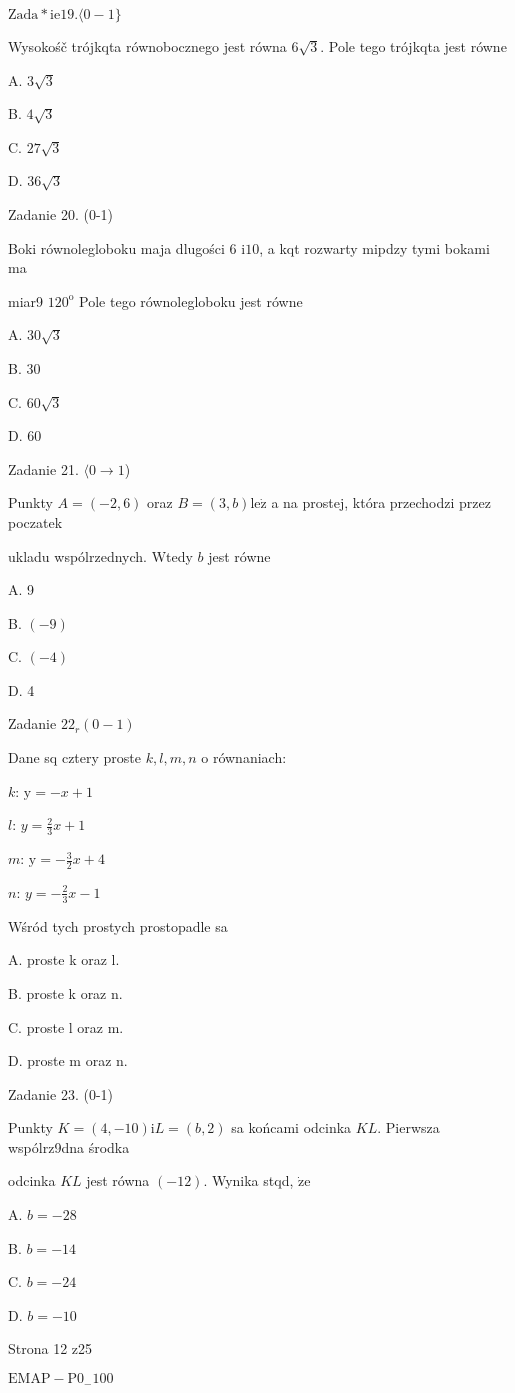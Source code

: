 \documentclass[a4paper,12pt]{article}
\begin{document}
$\mathrm{Z}\mathrm{a}\mathrm{d}\mathrm{a}*\mathrm{i}\mathrm{e}19. \langle 0-1\}$

Wysokośč trójkqta równobocznego jest równa $6\sqrt{3}$. Pole tego trójkqta jest równe

A. $3\sqrt{3}$

B. $4\sqrt{3}$

C. $27\sqrt{3}$

D. $36\sqrt{3}$

Zadanie 20. (0-1)

Boki równolegloboku maja dlugości 6 $\mathrm{i} 10$, a kqt rozwarty mipdzy tymi bokami ma

miar9 $120^{\mathrm{o}}$ Pole tego równolegloboku jest równe

A. $30\sqrt{3}$

B. 30

C. $60\sqrt{3}$

D. 60

Zadanie 21. $\langle 0\rightarrow 1$)

Punkty $A=(-2,6)$ oraz $B=(3,b) \mathrm{l}\mathrm{e}\dot{\mathrm{z}}$ a na prostej, która przechodzi przez poczatek

ukladu wspólrzednych. Wtedy $b$ jest równe

A. 9

B. $(-9)$

C. $(-4)$

D. 4

Zadanie $22_{r}(0-1)$

Dane sq cztery proste $k, l, m, n$ o równaniach:

$k$: $\mathrm{y}=-x+1$

$l$: $y=\displaystyle \frac{2}{3}x+1$

$m$: $\displaystyle \mathrm{y}=-\frac{3}{2}x+4$

$n$: $y=-\displaystyle \frac{2}{3}x-1$

Wśród tych prostych prostopadle sa

A. proste k oraz l.

B. proste k oraz n.

C. proste l oraz m.

D. proste m oraz n.

Zadanie 23. (0-1)

Punkty $K=(4,-10) \mathrm{i} L=(b,2)$ sa końcami odcinka $KL$. Pierwsza wspólrz9dna środka

odcinka $KL$ jest równa $(-12)$. Wynika stqd, $\dot{\mathrm{z}}\mathrm{e}$

A. $b=-28$

B. $b=-14$

C. $b=-24$

D. $b=-10$

Strona 12 z25

$\mathrm{E}\mathrm{M}\mathrm{A}\mathrm{P}-\mathrm{P}0_{-}100$
\end{document}
